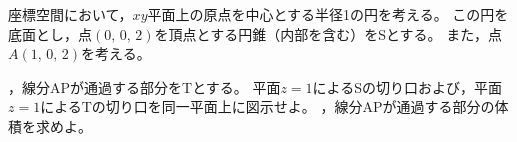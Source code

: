 \documentclass[../../main.tex]{subfiles}
\begin{document}
座標空間において，$xy$平面上の原点を中心とする半径1の円を考える。
この円を底面とし，点$(0, \, 0, \, 2)$を頂点とする円錐（内部を含む）をSとする。
また，点$A(1, \, 0, \, 2)$を考える。
\begin{enumerate}
  ，線分APが通過する部分をTとする。
    平面$z=1$によるSの切り口および，平面$z=1$によるTの切り口を同一平面上に図示せよ。
  ，線分APが通過する部分の体積を求めよ。
\end{enumerate}
\end{document}
